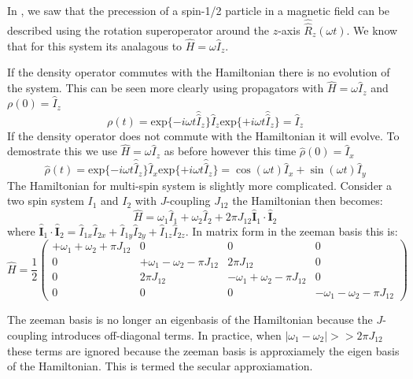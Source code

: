In , we saw that the precession of a spin-1/2 particle in a magnetic field can be described using the rotation superoperator around the $z$-axis $\hat{\hat{R}}_z(\omega t)$. We know that for this system its analagous to $\hat{H} = \omega\hat{I}_z$.

If the density operator commutes with the Hamiltonian there is no evolution of the system.
This can be seen more clearly using propagators with $\hat{H} = \omega\hat{I}_z$ and $\rho(0) = \hat{I}_z$
\begin{equation}
  \rho(t) = \text{exp}\{-i\omega t\hat{\hat{I}}_z\}\hat{I}_z\text{exp}\{+i\omega t\hat{\hat{I}}_z\} = \hat{I}_z
\end{equation}
If the density operator does not commute with the Hamiltonian it will evolve. To demostrate this we use
$\hat{H} = \omega\hat{I}_z$ as before  however this time $\hat\rho(0) = \hat{I}_x$
\begin{equation}
  \hat\rho(t) = \text{exp}\{-i\omega t\hat{\hat{I}}_z\}\hat{I}_x\text{exp}\{+i\omega t\hat{\hat{I}}_z\} = \cos(\omega t)\hat{I}_x + \sin(\omega t)\hat{I}_y
\end{equation}
The Hamiltonian for multi-spin system is slightly more complicated. Consider a two spin
system $I_1$ and $I_2$ with $J$-coupling $J_{12}$ the Hamiltonian then becomes:
\begin{equation}
  \hat{H} = \omega_1\hat{I}_1 + \omega_2\hat{I}_2 + 2\pi J_{12}\hat{\mathbf{I}}_1\cdot\hat{\mathbf{I}}_2
\end{equation}
where $\hat{\mathbf{I}}_1\cdot\hat{\mathbf{I}}_2 = \hat{I}_{1x}\hat{I}_{2x} + \hat{I}_{1y}\hat{I}_{2y} + \hat{I}_{1z}\hat{I}_{2z}$.
In matrix form in the zeeman basis this is:
\begin{equation}
  \hat{H} = \frac{1}{2}\begin{pmatrix}
    +\omega_1 + \omega_2 + \pi J_{12} & 0 & 0 & 0\\
    0 & +\omega_1 - \omega_2 - \pi J_{12} & 2\pi J_{12} & 0\\
    0 & 2\pi J_{12} & -\omega_1 + \omega_2 - \pi J_{12} & 0\\
    0 & 0 & 0 & -\omega_1 - \omega_2 - \pi J_{12}
\end{pmatrix}
\end{equation}

The zeeman basis is no longer an eigenbasis of the Hamiltonian because the $J$-coupling
introduces off-diagonal terms. In practice, when $|\omega_1-\omega_2| >> 2\pi J_{12}$
these terms are ignored because the zeeman basis is approxiamely the eigen basis of the Hamiltonian. This is termed the secular approxiamation.

